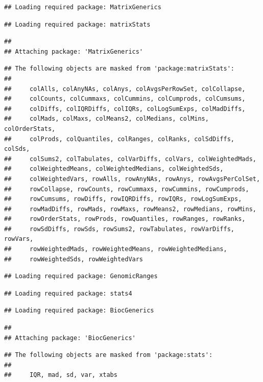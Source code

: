 \documentclass[
]{article}
\begin{document}
\begin{verbatim}
## Loading required package: MatrixGenerics
\end{verbatim}

\begin{verbatim}
## Loading required package: matrixStats
\end{verbatim}

\begin{verbatim}
## 
## Attaching package: 'MatrixGenerics'
\end{verbatim}

\begin{verbatim}
## The following objects are masked from 'package:matrixStats':
## 
##     colAlls, colAnyNAs, colAnys, colAvgsPerRowSet, colCollapse,
##     colCounts, colCummaxs, colCummins, colCumprods, colCumsums,
##     colDiffs, colIQRDiffs, colIQRs, colLogSumExps, colMadDiffs,
##     colMads, colMaxs, colMeans2, colMedians, colMins, colOrderStats,
##     colProds, colQuantiles, colRanges, colRanks, colSdDiffs, colSds,
##     colSums2, colTabulates, colVarDiffs, colVars, colWeightedMads,
##     colWeightedMeans, colWeightedMedians, colWeightedSds,
##     colWeightedVars, rowAlls, rowAnyNAs, rowAnys, rowAvgsPerColSet,
##     rowCollapse, rowCounts, rowCummaxs, rowCummins, rowCumprods,
##     rowCumsums, rowDiffs, rowIQRDiffs, rowIQRs, rowLogSumExps,
##     rowMadDiffs, rowMads, rowMaxs, rowMeans2, rowMedians, rowMins,
##     rowOrderStats, rowProds, rowQuantiles, rowRanges, rowRanks,
##     rowSdDiffs, rowSds, rowSums2, rowTabulates, rowVarDiffs, rowVars,
##     rowWeightedMads, rowWeightedMeans, rowWeightedMedians,
##     rowWeightedSds, rowWeightedVars
\end{verbatim}

\begin{verbatim}
## Loading required package: GenomicRanges
\end{verbatim}

\begin{verbatim}
## Loading required package: stats4
\end{verbatim}

\begin{verbatim}
## Loading required package: BiocGenerics
\end{verbatim}

\begin{verbatim}
## 
## Attaching package: 'BiocGenerics'
\end{verbatim}

\begin{verbatim}
## The following objects are masked from 'package:stats':
## 
##     IQR, mad, sd, var, xtabs
\end{verbatim}
\end{document}
